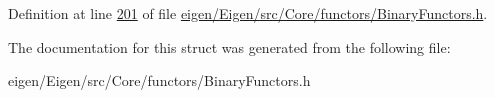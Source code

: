 Definition at line \hyperlink{eigen_2_eigen_2src_2_core_2functors_2_binary_functors_8h_source_l00201}{201} of file \hyperlink{eigen_2_eigen_2src_2_core_2functors_2_binary_functors_8h_source}{eigen/\+Eigen/src/\+Core/functors/\+Binary\+Functors.\+h}.



The documentation for this struct was generated from the following file\+:\begin{DoxyCompactItemize}
\item 
eigen/\+Eigen/src/\+Core/functors/\+Binary\+Functors.\+h\end{DoxyCompactItemize}
